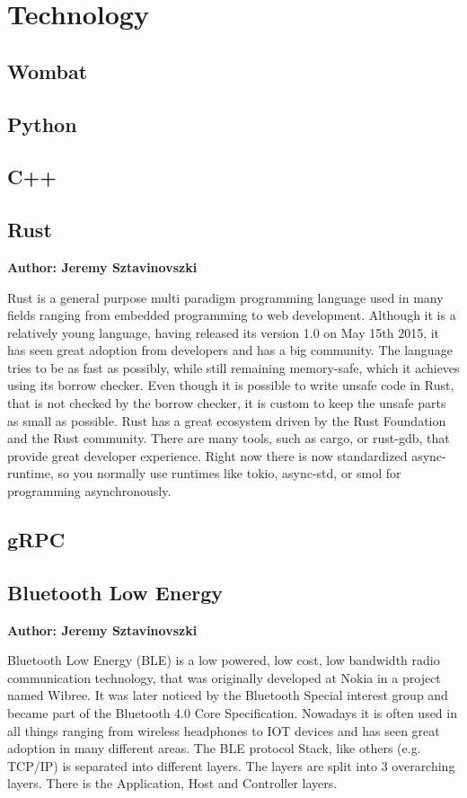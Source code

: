 \chapter{Technology}


\section{Wombat}

\section{Python}

\section{C++}

\section{Rust}
\textbf{Author: Jeremy Sztavinovszki}

Rust is a general purpose multi paradigm programming language used in many fields ranging from embedded programming to web development. Although it is a relatively young language, having released its version 1.0 on May 15th 2015, it has seen great adoption from developers and has a big community. The language tries to be as fast as possibly, while still remaining memory-safe, which it achieves using its borrow checker. Even though it is possible to write unsafe code in Rust, that is not checked by the borrow checker, it is custom to keep the unsafe parts as small as possible.
Rust has a great ecosystem driven by the Rust Foundation and the Rust community. There are many tools, such as cargo, or rust-gdb, that provide great developer experience.
Right now there is now standardized async-runtime, so you normally use runtimes like tokio, async-std, or smol for programming asynchronously.

\section{gRPC}

\section{Bluetooth Low Energy}
\textbf{Author: Jeremy Sztavinovszki}

Bluetooth Low Energy (BLE) is a low powered, low cost, low bandwidth radio communication technology, that was originally developed at Nokia in a project named Wibree. It was later noticed by the Bluetooth Special interest group and became part of the Bluetooth 4.0 Core Specification. Nowadays it is often used in all things ranging from wireless headphones to IOT devices and has seen great adoption in many different areas. The BLE protocol Stack, like others (e.g. TCP/IP) is separated into different layers. The layers are split into 3 overarching layers. There is the Application, Host and Controller layers.

